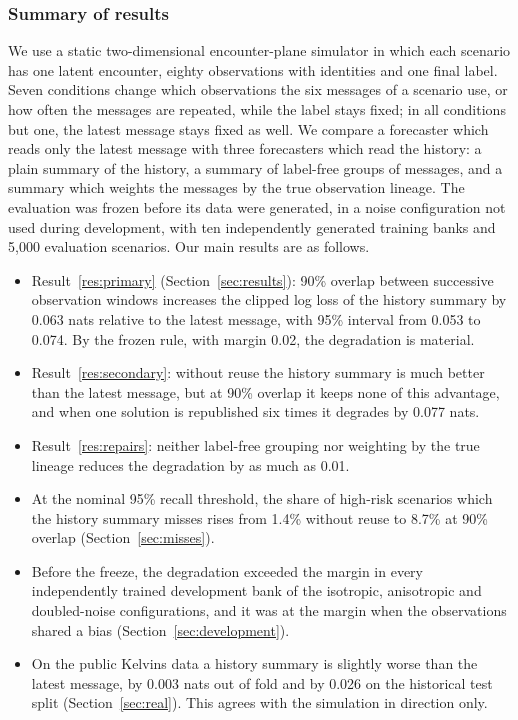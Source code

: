 \documentclass[conference]{IEEEtran}
\begin{document}
\subsubsection*{Summary of results}
We use a static two-dimensional encounter-plane simulator in which each scenario has one latent encounter, eighty observations with identities and one final label. Seven conditions change which observations the six messages of a scenario use, or how often the messages are repeated, while the label stays fixed; in all conditions but one, the latest message stays fixed as well. We compare a forecaster which reads only the latest message with three forecasters which read the history: a plain summary of the history, a summary of label-free groups of messages, and a summary which weights the messages by the true observation lineage. The evaluation was frozen before its data were generated, in a noise configuration not used during development, with ten independently generated training banks and 5,000 evaluation scenarios. Our main results are as follows.
\begin{itemize}
\item Result~\ref{res:primary} (Section~\ref{sec:results}): 90\% overlap between successive observation windows increases the clipped log loss of the history summary by 0.063 nats relative to the latest message, with 95\% interval from 0.053 to 0.074. By the frozen rule, with margin 0.02, the degradation is material.
\item Result~\ref{res:secondary}: without reuse the history summary is much better than the latest message, but at 90\% overlap it keeps none of this advantage, and when one solution is republished six times it degrades by 0.077 nats.
\item Result~\ref{res:repairs}: neither label-free grouping nor weighting by the true lineage reduces the degradation by as much as 0.01.
\item At the nominal 95\% recall threshold, the share of high-risk scenarios which the history summary misses rises from 1.4\% without reuse to 8.7\% at 90\% overlap (Section~\ref{sec:misses}).
\item Before the freeze, the degradation exceeded the margin in every independently trained development bank of the isotropic, anisotropic and doubled-noise configurations, and it was at the margin when the observations shared a bias (Section~\ref{sec:development}).
\item On the public Kelvins data a history summary is slightly worse than the latest message, by 0.003 nats out of fold and by 0.026 on the historical test split (Section~\ref{sec:real}). This agrees with the simulation in direction only.
\end{itemize}
\end{document}
